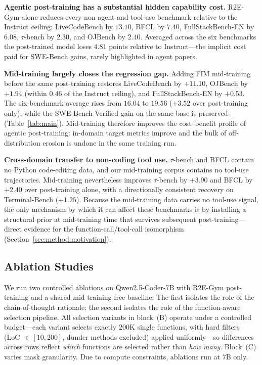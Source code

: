 \textbf{Agentic post-training has a substantial hidden capability cost.}
R2E-Gym alone reduces every non-agent and tool-use benchmark relative to
the Instruct ceiling: LiveCodeBench by $13.10$, BFCL by $7.40$,
FullStackBench-EN by $6.08$, $\tau$-bench by $2.30$, and OJBench by
$2.40$. Averaged across the six benchmarks the post-trained model loses
$4.81$ points relative to Instruct---the implicit cost paid for
SWE-Bench gains, rarely highlighted in agent papers.

\textbf{Mid-training largely closes the regression gap.}
Adding FIM mid-training before the same post-training restores
LiveCodeBench by $+11.10$, OJBench by $+1.94$ (within $0.46$ of the
Instruct ceiling), and FullStackBench-EN by $+0.53$. The six-benchmark
average rises from $16.04$ to $19.56$ ($+3.52$ over post-training only),
while the SWE-Bench-Verified gain on the same base is preserved
(Table~\ref{tab:main}). Mid-training therefore improves the
cost--benefit profile of agentic post-training: in-domain target
metrics improve and the bulk of off-distribution erosion is undone in
the same training run.

\textbf{Cross-domain transfer to non-coding tool use.}
$\tau$-bench and BFCL contain no Python code-editing data, and our
mid-training corpus contains no tool-use trajectories. Mid-training
nevertheless improves $\tau$-bench by $+3.90$ and BFCL by $+2.40$ over
post-training alone, with a directionally consistent recovery on
Terminal-Bench ($+1.25$). Because the mid-training data carries no
tool-use signal, the only mechanism by which it can affect these
benchmarks is by installing a structural prior at mid-training time
that survives subsequent post-training---direct evidence for the
function-call/tool-call isomorphism (Section~\ref{sec:method:motivation}).

\vspace{-0.5ex}
\subsection{Ablation Studies}
\label{sec:exp:ablation}

We run two controlled ablations on Qwen2.5-Coder-7B with R2E-Gym
post-training and a shared mid-training-free baseline. The first
isolates the role of the chain-of-thought rationale; the second isolates
the role of the function-aware selection pipeline. All selection
variants in block~(B) operate under a controlled budget---each variant
selects exactly $200$K single functions, with hard filters
(LoC~$\in[10,200]$, dunder methods excluded) applied uniformly---so
differences across rows reflect \emph{which} functions are selected
rather than \emph{how many}. Block~(C) varies mask granularity. Due to
compute constraints, ablations run at 7B only.

